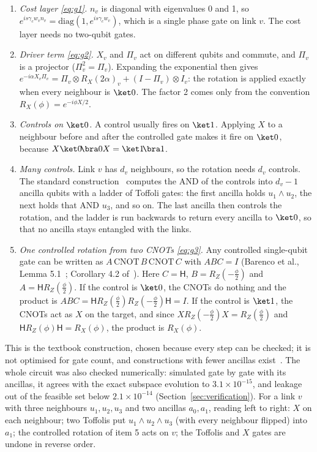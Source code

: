 \documentclass[11pt,a4paper]{article}
\begin{document}
\begin{enumerate}[leftmargin=*]
\item \emph{Cost layer \eqref{eq:g1}.} $n_v$ is diagonal with eigenvalues 0 and 1, so
$e^{is\gamma_cw_vn_v}=\mathrm{diag}(1,e^{is\gamma_cw_v})$, which is a single phase gate on link $v$. The
cost layer needs no two-qubit gates.
\item \emph{Driver term \eqref{eq:g2}.} $X_v$ and $\Pi_v$ act on different qubits and commute, and
$\Pi_v$ is a projector ($\Pi_v^2=\Pi_v$). Expanding the exponential then gives
$e^{-i\alpha X_v\Pi_v}=\Pi_v\otimes R_X(2\alpha)_v+(I-\Pi_v)\otimes I_v$: the rotation is applied exactly
when every neighbour is $\ket0$. The factor 2 comes only from the convention
$R_X(\phi)=e^{-i\phi X/2}$.
\item \emph{Controls on $\ket0$.} A control usually fires on $\ket1$. Applying $X$ to a neighbour before
and after the controlled gate makes it fire on $\ket0$, because $X\ket0\!\bra0X=\ket1\!\bra1$.
\item \emph{Many controls.} Link $v$ has $d_v$ neighbours, so the rotation needs $d_v$ controls. The
standard construction~\cite[Fig.~4.10]{nielsen2010quantum} computes the AND of the controls into
$d_v-1$ ancilla qubits with a ladder of Toffoli gates: the first ancilla holds $u_1\wedge u_2$, the
next holds that AND $u_3$, and so on. The last ancilla then controls the rotation, and the ladder is run
backwards to return every ancilla to $\ket0$, so that no ancilla stays entangled with the links.
\item \emph{One controlled rotation from two CNOTs \eqref{eq:g3}.} Any controlled single-qubit gate can
be written as $A\,\mathrm{CNOT}\,B\,\mathrm{CNOT}\,C$ with $ABC=I$ (Barenco et al., Lemma
5.1~\cite{barenco1995elementary}; Corollary 4.2 of~\cite{nielsen2010quantum}). Here $C=\mathsf H$,
$B=R_Z(-\frac\phi2)$ and $A=\mathsf HR_Z(\frac\phi2)$. If the control is $\ket0$, the CNOTs do nothing
and the product is $ABC=\mathsf HR_Z(\frac\phi2)R_Z(-\frac\phi2)\mathsf H=I$. If the control is $\ket1$,
the CNOTs act as $X$ on the target, and since $XR_Z(-\frac\phi2)X=R_Z(\frac\phi2)$ and
$\mathsf HR_Z(\phi)\mathsf H=R_X(\phi)$, the product is $R_X(\phi)$.
\end{enumerate}
This is the textbook construction, chosen because every step can be checked; it is not optimised for
gate count, and constructions with fewer ancillas exist~\cite{barenco1995elementary}. The whole circuit was also checked
numerically: simulated gate by gate with its ancillas, it agrees with the exact subspace evolution to $3.1\times10^{-15}$, and leakage out of the feasible set below $2.1\times10^{-14}$ (Section~\ref{sec:verification}).
For a link $v$ with three neighbours $u_1,u_2,u_3$ and two ancillas $a_0,a_1$, reading left to right:
$X$ on each neighbour; two Toffolis put $u_1\wedge u_2\wedge u_3$ (with every neighbour flipped) into
$a_1$; the controlled rotation of item 5 acts on $v$; the Toffolis and $X$ gates are undone in reverse
order.
\end{document}
